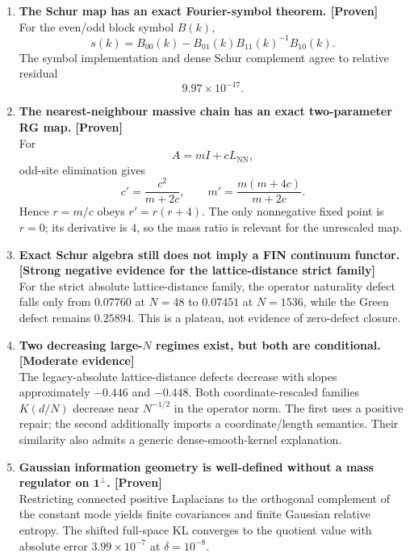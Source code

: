 \documentclass[11pt,a4paper,openany]{report}
\newcommand{\statusProven}{\textcolor{fingreen}{[Proven]}}
\newcommand{\statusModerate}{\textcolor{finviolet}{[Moderate evidence]}}
\begin{document}
\begin{enumerate}
\item 
\textbf{The Schur map has an exact Fourier-symbol theorem. \statusProven{}}\\
For the even/\allowbreak{}odd block symbol \(B(k)\), \[
   s(k)
   =
   B_{00}(k)
   -
   B_{01}(k)B_{11}(k)^{-1}B_{10}(k).
   \] The symbol implementation and dense Schur complement agree to relative residual \[
   9.97\times10^{-17}.
   \]

\item 
\textbf{The nearest-neighbour massive chain has an exact two-parameter RG map. \statusProven{}}\\
For \[
   A=mI+cL_{\mathrm{NN}},
   \] odd-site elimination gives \[
   c'=\frac{c^2}{m+2c},
   \qquad
   m'=\frac{m(m+4c)}{m+2c}.
   \] Hence \(r=m/c\) obeys \(r'=r(r+4)\). The only nonnegative fixed point is \(r=0\); its derivative is \(4\), so the mass ratio is relevant for the unrescaled map.

\item 
\textbf{Exact Schur algebra still does not imply a FIN continuum functor. [Strong negative evidence for the lattice-distance strict family]}\\
For the strict absolute lattice-distance family, the operator naturality defect falls only from \(0.07760\) at \(N=48\) to \(0.07451\) at \(N=1536\), while the Green defect remains \(0.25894\). This is a plateau, not evidence of zero-defect closure.

\item 
\textbf{Two decreasing large-\(N\) regimes exist, but both are conditional. \statusModerate{}}\\
The legacy-absolute lattice-distance defects decrease with slopes approximately \(-0.446\) and \(-0.448\). Both coordinate-rescaled families \(K(d/N)\) decrease near \(N^{-1/2}\) in the operator norm. The first uses a positive repair; the second additionally imports a coordinate/\allowbreak{}length semantics. Their similarity also admits a generic dense-smooth-kernel explanation.

\item 
\textbf{Gaussian information geometry is well-defined without a mass regulator on \(\mathbf1^\perp\). \statusProven{}}\\
Restricting connected positive Laplacians to the orthogonal complement of the constant mode yields finite covariances and finite Gaussian relative entropy. The shifted full-space KL converges to the quotient value with absolute error \(3.99\times10^{-7}\) at \(\delta=10^{-8}\).


\end{enumerate}
\end{document}
